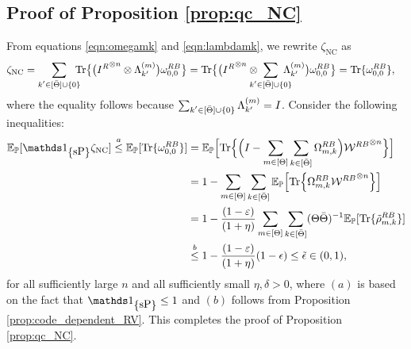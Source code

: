 \subsection{Proof of Proposition \ref{prop:qc_NC}}
\label{app:prop:proof:qc_NC}
    From equations \eqref{eqn:omegamk} and \eqref{eqn:lambdamk}, we rewrite $ \zeta_{\text{NC}}$ as
    \begin{align*}
        \zeta_{\text{NC}} &
        = \sum_{\substack{k'\in [\bTheta]\cup \{0\}}}\!\!\!\! \Tr\big\{\big({I^{\refe}}^{\tensor n} \tensor \Lambda_{k'}^{(m)}\big)\omega^{RB}_{0,0}\big\} = \Tr\big\{\big({I^{\refe}}^{\tensor n} \tensor \!\!\!\!\!\!\sum_{\substack{k'\in [\bTheta]\cup \{0\}}}\!\!\!\!\!\!\dpovm_{k'}^{(m)} \big)\omega^{RB}_{0,0}\big\} = \Tr\{\omega^{RB}_{0,0}\},
    \end{align*}
    where the equality follows because $\sum_{\substack{k'\in [\bar{\Theta}]\cup \{0\}}}\Lambda_{k'}^{(m)} = I$.
    Consider the following inequalities:
    \begin{align*}
        \EE_\PP[\I_{\curly{\mbox{\normalfont sP}}}\zeta_{\text{NC}}] \overset{a}{\leq} \EE_\PP[\Tr\{\omega^{RB}_{0,0}\}] &= 
        \EE_\PP\Big[\Tr\Big\{\Big(I-\sum_{m\in [\Theta]}\sum_{k\in[\bTheta]}\epovm_{m,k}^{\refe B}\Big) {\calW^{\refe B}}^{\tensor n}\Big\}\Big]\\
        &=
        1-\sum_{m\in [\Theta]}\sum_{k\in[\bTheta]}\EE_\PP\Big[\Tr\Big\{\epovm_{m,k}^{\refe B}{\calW^{\refe B}}^{\tensor n}\Big\}\Big]\\
        &= 1-\frac{(1-\varepsilon)}{(1+\eta)}\sum_{m\in [\Theta]}\sum_{k\in[\bTheta]}(\Theta\bTheta)^{-1}\EE_{\PP}[\Tr\{\rhotilde_{m,k}^{\refe B}\}]\\
        &\overset{b}{\leq}1-\frac{(1-\varepsilon)}{(1+\eta)}(1-\epsilon) \leq \tilde{\epsilon} \in (0,1),
    \end{align*}
    for all sufficiently large $n$ and all sufficiently small $\eta, \delta>0$, where $(a)$ is based on the fact that $\I_{\curly{\mbox{\normalfont sP}}}\leq 1$ and  $(b)$ follows from Proposition \ref{prop:code_dependent_RV}. This completes the proof of Proposition \ref{prop:qc_NC}. 

